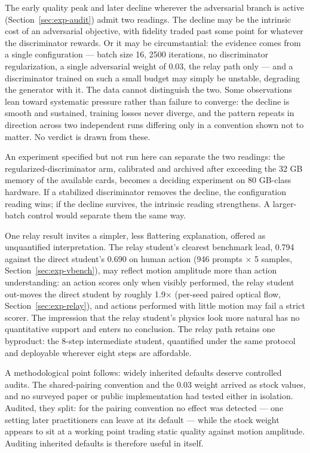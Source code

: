 \documentclass[11pt,a4paper]{article}
\begin{document}
The early quality peak and later decline wherever the adversarial branch is active (Section~\ref{sec:exp-audit}) admit two readings. The decline may be the intrinsic cost of an adversarial objective, with fidelity traded past some point for whatever the discriminator rewards. Or it may be circumstantial: the evidence comes from a single configuration — batch size 16, 2500 iterations, no discriminator regularization, a single adversarial weight of 0.03, the relay path only — and a discriminator trained on such a small budget may simply be unstable, degrading the generator with it. The data cannot distinguish the two. Some observations lean toward systematic pressure rather than failure to converge: the decline is smooth and sustained, training losses never diverge, and the pattern repeats in direction across two independent runs differing only in a convention shown not to matter. No verdict is drawn from these.

An experiment specified but not run here can separate the two readings: the regularized-discriminator arm, calibrated and archived after exceeding the 32 GB memory of the available cards, becomes a deciding experiment on 80 GB-class hardware. If a stabilized discriminator removes the decline, the configuration reading wins; if the decline survives, the intrinsic reading strengthens. A larger-batch control would separate them the same way.

One relay result invites a simpler, less flattering explanation, offered as unquantified interpretation. The relay student's clearest benchmark lead, 0.794 against the direct student's 0.690 on human action (946 prompts $\times$ 5 samples, Section~\ref{sec:exp-vbench}), may reflect motion amplitude more than action understanding: an action scores only when visibly performed, the relay student out-moves the direct student by roughly 1.9$\times$ (per-seed paired optical flow, Section~\ref{sec:exp-relay}), and actions performed with little motion may fail a strict scorer. The impression that the relay student's physics look more natural has no quantitative support and enters no conclusion. The relay path retains one byproduct: the 8-step intermediate student, quantified under the same protocol and deployable wherever eight steps are affordable.

A methodological point follows: widely inherited defaults deserve controlled audits. The shared-pairing convention and the 0.03 weight arrived as stock values, and no surveyed paper or public implementation had tested either in isolation. Audited, they split: for the pairing convention no effect was detected — one setting later practitioners can leave at its default — while the stock weight appears to sit at a working point trading static quality against motion amplitude. Auditing inherited defaults is therefore useful in itself.
\end{document}
